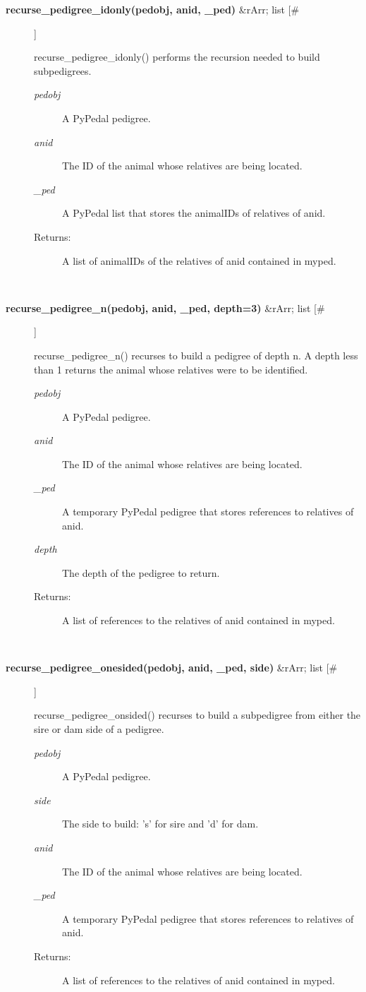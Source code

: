 \begin{description}
\item[\textbf{recurse\_pedigree\_idonly(pedobj, anid, \_ped)}
 \&rArr; list [\#]]

 recurse\_pedigree\_idonly() performs the recursion needed to build subpedigrees.
\begin{description}
\item[\emph{pedobj}
] A PyPedal pedigree.
\item[\emph{anid}
] The ID of the animal whose relatives are being located.
\item[\emph{\_ped}
] A PyPedal list that stores the animalIDs of relatives of anid.
\item[Returns:] A list of animalIDs of the relatives of anid contained in myped.

\end{description}
\\ 

\item[\textbf{recurse\_pedigree\_n(pedobj, anid, \_ped, depth=3)}
 \&rArr; list [\#]]

 recurse\_pedigree\_n() recurses to build a pedigree of depth n. A depth less than 1 returns the animal whose relatives were to be identified.
\begin{description}
\item[\emph{pedobj}
] A PyPedal pedigree.
\item[\emph{anid}
] The ID of the animal whose relatives are being located.
\item[\emph{\_ped}
] A temporary PyPedal pedigree that stores references to relatives of anid.
\item[\emph{depth}
] The depth of the pedigree to return.
\item[Returns:] A list of references to the relatives of anid contained in myped.

\end{description}
\\ 

\item[\textbf{recurse\_pedigree\_onesided(pedobj, anid, \_ped, side)}
 \&rArr; list [\#]]

 recurse\_pedigree\_onsided() recurses to build a subpedigree from either the sire or dam side of a pedigree.
\begin{description}
\item[\emph{pedobj}
] A PyPedal pedigree.
\item[\emph{side}
] The side to build: 's' for sire and 'd' for dam.
\item[\emph{anid}
] The ID of the animal whose relatives are being located.
\item[\emph{\_ped}
] A temporary PyPedal pedigree that stores references to relatives of anid.
\item[Returns:] A list of references to the relatives of anid contained in myped.

\end{description}
\\ 


\end{description}


